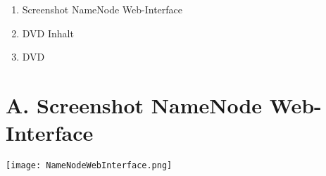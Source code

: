 
\addchap{\langanhang}

{\Large
\begin{enumerate}[label=\Alph*.]
	\item Screenshot NameNode Web-Interface
	\item DVD Inhalt
	\item DVD 
\end{enumerate}
}
\pagebreak

\section*{A. Screenshot NameNode Web-Interface}\label{sec:ScreenNameNodeWeb}
\texttt{[image: NameNodeWebInterface.png]}
\pagebreak

